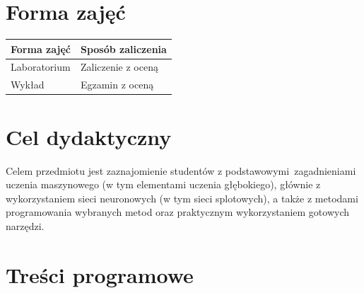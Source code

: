 \documentclass[12pt, a4paper]{article}
\begin{document}
\section{Forma zajęć}

\begin{tabular}{ll}
  \hline
  \textbf{Forma zajęć} & \textbf{Sposób zaliczenia} \\
  \hline
  Laboratorium & Zaliczenie z oceną \\
  Wykład & Egzamin z oceną \\
  \hline
\end{tabular}

\section{Cel dydaktyczny}

Celem przedmiotu jest zaznajomienie studentów z podstawowymi zagadnieniami uczenia maszynowego (w tym elementami uczenia głębokiego), głównie z wykorzystaniem sieci neuronowych (w tym sieci splotowych), a także z metodami programowania wybranych metod oraz praktycznym wykorzystaniem gotowych narzędzi.

\section{Treści programowe}
\end{document}
